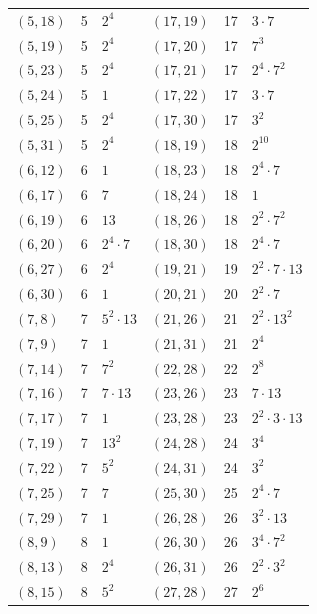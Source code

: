 \documentclass[11pt]{article}
\begin{document}
\begin{longtable}{@{}lrl@{\qquad}lrl@{}}
$(5,18)$ & 5 & $2^{4}$ & $(17,19)$ & 17 & $3\cdot 7$\\
$(5,19)$ & 5 & $2^{4}$ & $(17,20)$ & 17 & $7^{3}$\\
$(5,23)$ & 5 & $2^{4}$ & $(17,21)$ & 17 & $2^{4}\cdot 7^{2}$\\
$(5,24)$ & 5 & $1$ & $(17,22)$ & 17 & $3\cdot 7$\\
$(5,25)$ & 5 & $2^{4}$ & $(17,30)$ & 17 & $3^{2}$\\
$(5,31)$ & 5 & $2^{4}$ & $(18,19)$ & 18 & $2^{10}$\\
$(6,12)$ & 6 & $1$ & $(18,23)$ & 18 & $2^{4}\cdot 7$\\
$(6,17)$ & 6 & $7$ & $(18,24)$ & 18 & $1$\\
$(6,19)$ & 6 & $13$ & $(18,26)$ & 18 & $2^{2}\cdot 7^{2}$\\
$(6,20)$ & 6 & $2^{4}\cdot 7$ & $(18,30)$ & 18 & $2^{4}\cdot 7$\\
$(6,27)$ & 6 & $2^{4}$ & $(19,21)$ & 19 & $2^{2}\cdot 7\cdot 13$\\
$(6,30)$ & 6 & $1$ & $(20,21)$ & 20 & $2^{2}\cdot 7$\\
$(7,8)$ & 7 & $5^{2}\cdot 13$ & $(21,26)$ & 21 & $2^{2}\cdot 13^{2}$\\
$(7,9)$ & 7 & $1$ & $(21,31)$ & 21 & $2^{4}$\\
$(7,14)$ & 7 & $7^{2}$ & $(22,28)$ & 22 & $2^{8}$\\
$(7,16)$ & 7 & $7\cdot 13$ & $(23,26)$ & 23 & $7\cdot 13$\\
$(7,17)$ & 7 & $1$ & $(23,28)$ & 23 & $2^{2}\cdot 3\cdot 13$\\
$(7,19)$ & 7 & $13^{2}$ & $(24,28)$ & 24 & $3^{4}$\\
$(7,22)$ & 7 & $5^{2}$ & $(24,31)$ & 24 & $3^{2}$\\
$(7,25)$ & 7 & $7$ & $(25,30)$ & 25 & $2^{4}\cdot 7$\\
$(7,29)$ & 7 & $1$ & $(26,28)$ & 26 & $3^{2}\cdot 13$\\
$(8,9)$ & 8 & $1$ & $(26,30)$ & 26 & $3^{4}\cdot 7^{2}$\\
$(8,13)$ & 8 & $2^{4}$ & $(26,31)$ & 26 & $2^{2}\cdot 3^{2}$\\
$(8,15)$ & 8 & $5^{2}$ & $(27,28)$ & 27 & $2^{6}$\\
\end{longtable}
\endgroup
\end{document}
